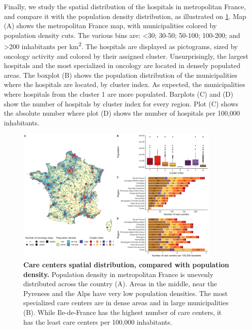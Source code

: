 Finally, we study the spatial distribution of the hospitals in metropolitan France,
and compare it with the population density distribution, as illustrated on
\cref{fig:clustering-map}. Map (A) shows the metropolitan France map, with
municipalities colored by population density cuts. The various bins are:
<30; 30-50; 50-100; 100-200; and >200 inhabitants per km\textsuperscript{2}. The
hospitals are displayed as pictograms, sized by oncology activity and colored
by their assigned cluster. Unsurprisingly, the largest hospitals and the most
specialized in oncology are located in densely populated areas. The boxplot (B)
shows the population distribution of the municipalities where the hospitals are
located, by cluster index. As expected, the municipalities where hospitals from
the cluster 1 are more populated. Barplots (C) and (D) show the number of
hospitals by cluster index for every region. Plot (C) shows the absolute number
where plot (D) shows the number of hospitals per 100,000 inhabitants.

\begin{figure}[H]
    \includegraphics[width=0.9\textwidth]{images/camion/supplemental/sup_fig4_care_centers_pop_density.png}
    \centering
    \caption{ \textbf{Care centers spatial distribution, compared with
            population density.} Population density in metropolitan France is
        unevenly distributed across the country (A). Areas in the middle, near
        the Pyrenees and the Alps have very low population densities. The most
        specialized care centers are in dense areas and in large municipalities
        (B). While Ile-de-France has the highest number of care centers, it has
        the least care centers per 100,000 inhabitants. }
    \label{fig:clustering-map}
\end{figure}

